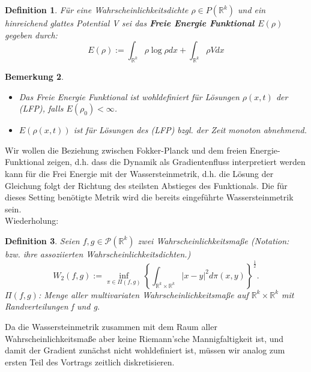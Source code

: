 \documentclass[11pt,a4paper,notitlepage]{scrreprt}
\newcommand{\RR}{\mathbb{R}}
\newtheorem{defi}{Definition}[section]
\newtheorem{bem}[defi]{Bemerkung}
\begin{document}
\begin{defi}
Für eine Wahrscheinlichkeitsdichte $\rho\in P(\RR^k)$ und ein hinreichend glattes Potential V sei das \textbf{Freie Energie Funktional $E(\rho)$} gegeben durch:
\begin{equation}
E(\rho):=\int_{\RR^k} \rho\log\rho dx + \int_{\RR^k}\rho V dx \label{FEFktn}
\end{equation}
\end{defi}

\begin{bem}
\begin{itemize}
\item Das Freie Energie Funktional ist wohldefiniert für Lösungen $\rho(x,t)$ der (LFP), falls $E(\rho_0)<\infty$.
\item $E(\rho(x,t))$ ist für Lösungen des (LFP) bzgl. der Zeit monoton abnehmend.\end{itemize}
\end{bem}

Wir wollen die Beziehung zwischen Fokker-Planck und dem freien Energie-Funktional zeigen, d.h. dass die Dynamik als Gradientenfluss interpretiert werden kann für die Frei Energie mit der Wassersteinmetrik, d.h. die Lösung der Gleichung folgt der Richtung des steilsten Abstieges des Funktionals. Die für dieses Setting benötigte Metrik wird die bereits eingeführte Wassersteinmetrik sein. \\

Wiederholung:
\begin{defi}
Seien $f,g\in\mathcal{P}(\RR^k)$ zwei Wahrscheinlichkeitsmaße (Notation: bzw. ihre assoziierten Wahrscheinlichkeitsdichten.)
\begin{equation}
W_2(f,g):=\inf_{\pi \in \Pi(f,g)} \left\{ \int_{\RR^k\times\RR^k} \vert x-y \vert^2 d\pi(x,y)\right\}^\frac{1}{2}.\label{W2}
\end{equation}
$\Pi(f,g)$: Menge aller multivariaten Wahrscheinlichkeitsmaße auf $\RR^k \times \RR^k$ mit Randverteilungen f und g.
\end{defi}
Da die Wassersteinmetrik zusammen mit dem Raum aller Wahrscheinlichkeitsmaße aber keine Riemann'sche Mannigfaltigkeit ist, und damit der Gradient zunächst nicht wohldefiniert ist, müssen wir analog zum ersten Teil des Vortrags zeitlich diskretisieren.\\
\end{document}
